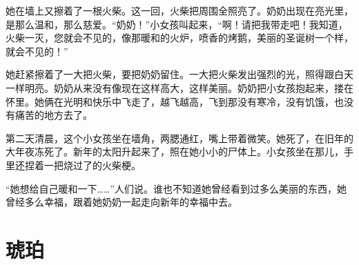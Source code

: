 \documentclass[12pt,UTF-8,openany]{ctexbook}
\begin{document}
\begin{large}
    她在墙上又擦着了一根火柴。这一回，火柴把周围全照亮了。奶奶出现在亮光里，是那么温和，那么慈爱。“奶奶！”小女孩叫起来，“啊！请把我带走吧！我知道，火柴一灭，您就会不见的，像那暖和的火炉，喷香的烤鹅，美丽的圣诞树一个样，就会不见的！”
    
    她赶紧擦着了一大把火柴，要把奶奶留住。一大把火柴发出强烈的光，照得跟白天一样明亮。奶奶从来没有像现在这样高大，这样美丽。奶奶把小女孩抱起来，搂在怀里。她俩在光明和快乐中飞走了，越飞越高，飞到那没有寒冷，没有饥饿，也没有痛苦的地方去了。
    
    第二天清晨，这个小女孩坐在墙角，两腮通红，嘴上带着微笑。她死了，在旧年的大年夜冻死了。新年的太阳升起来了，照在她小小的尸体上。小女孩坐在那儿，手里还捏着一把烧过了的火柴梗。
    
    “她想给自己暖和一下……”人们说。谁也不知道她曾经看到过多么美丽的东西，她曾经多么幸福，跟着她奶奶一起走向新年的幸福中去。
    
\end{large}



\chapter{琥珀}
\end{document}
